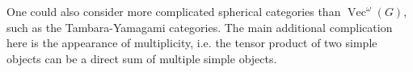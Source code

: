 \documentclass{amsart}
\DeclareMathOperator{\Vect}{Vec}
\begin{document}
One could also consider more complicated spherical categories than $\Vect^\omega(G)$, such as the 
Tambara-Yamagami categories.  The main additional complication here is the appearance of multiplicity, i.e. the tensor product of 
two simple objects can be a direct sum of multiple simple objects.  
\medskip


 


\end{document}
